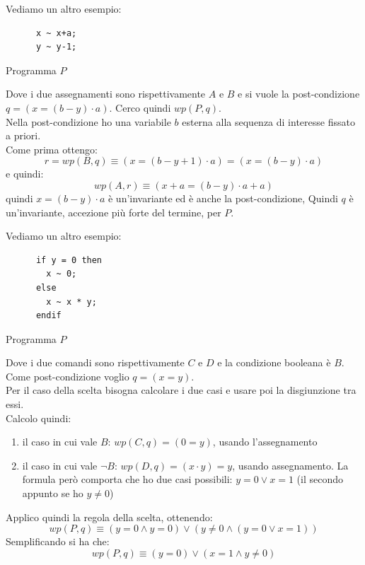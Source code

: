 				      				\begin{esempio}
				      					Vediamo un altro esempio:
				      					\begin{listing}[H]
				      						\begin{lstlisting}
      x ~ x+a;
      y ~ y-1;
				      						\end{lstlisting}
				      						\caption{Programma $P$}
				      					\end{listing}
				      					Dove i due assegnamenti sono rispettivamente $A$ e $B$ e si vuole la
				      					post-condizione $q=(x=(b-y)\cdot a)$. Cerco quindi $wp(P, q)$.\\
				      					Nella post-condizione ho una variabile $b$ esterna alla sequenza di interesse
				      					fissato a priori.\\
				      					Come prima ottengo:
				      					\[r=wp(B, q)\equiv(x=(b-y+1)\cdot a)=(x=(b-y)\cdot a)\]
				      					e quindi:
				      					\[wp(A, r)\equiv(x+a=(b-y)\cdot a+a)\]
				      					quindi $x=(b-y)\cdot a$ è un'invariante ed è anche la post-condizione, Quindi $q$
				      					è un'invariante, accezione più forte del termine, per $P$.
				      				\end{esempio}
				      				\begin{esempio}
				      					Vediamo un altro esempio:
				      					\begin{listing}[H]
				      						\begin{lstlisting}
      if y = 0 then
        x ~ 0;
      else
        x ~ x * y;
      endif
				      						\end{lstlisting}
				      						\caption{Programma $P$}
				      					\end{listing}
				      					Dove i due comandi sono rispettivamente $C$ e $D$ e la condizione booleana è
				      					$B$. Come post-condizione voglio $q=(x=y)$.\\
				      					Per il caso della scelta bisogna calcolare i due casi e usare poi la
				      					disgiunzione tra essi.\\
				      					Calcolo quindi:
				      					\begin{enumerate}
				      						\item il caso in cui vale $B$: $wp(C, q)=(0=y)$, usando l'assegnamento
				      						\item il caso in cui vale $\neg B$: $wp(D, q)=(x\cdot y)=y$, usando
				      						      assegnamento. La formula però comporta che ho due casi possibili: $y=0\lor
				      						      x=1$ (il secondo appunto se ho $y\neq 0$)
				      					\end{enumerate}
				      					Applico quindi la regola della scelta, ottenendo:
				      					\[wp(P, q)\equiv (y=0\land y=0)\lor(y\neq 0\land (y=0\lor x=1))\]
				      					Semplificando si ha che:
				      					\[wp(P, q)\equiv(y=0)\lor(x=1\land y\neq 0)\]
				      				\end{esempio}
